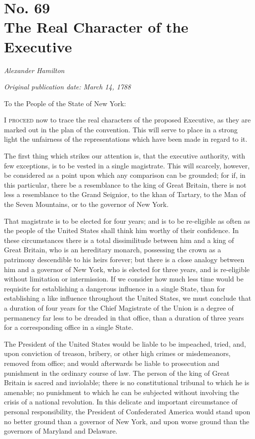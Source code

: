 \chapter[No. 69: The Real Character of the Executive]{No. 69\\ {\small The Real Character of the Executive}}

\textit{Alexander Hamilton}

\textit{Original publication date: March 14, 1788}
\vspace{1cm}

To the People of the State of New York:
\vspace{.4cm}

\textsc{I proceed} now to trace the real characters of the proposed Executive, as they are marked out in the plan of the convention. 
This will serve to place in a strong light the unfairness of the representations which have been made in regard to it.

The first thing which strikes our attention is, that the executive authority, with few exceptions, is to be vested in a single magistrate. 
This will scarcely, however, be considered as a point upon which any comparison can be grounded; for if, in this particular, there be a resemblance to the king of Great Britain, there is not less a resemblance to the Grand Seignior, to the khan of Tartary, to the Man of the Seven Mountains, or to the governor of New York.

That magistrate is to be elected for four years; and is to be re-eligible as often as the people of the United States shall think him worthy of their confidence. 
In these circumstances there is a total dissimilitude between him and a king of Great Britain, who is an hereditary monarch, possessing the crown as a patrimony descendible to his heirs forever; but there is a close analogy between him and a governor of New York, who is elected for three years, and is re-eligible without limitation or intermission. 
If we consider how much less time would be requisite for establishing a dangerous influence in a single State, than for establishing a like influence throughout the United States, we must conclude that a duration of four years for the Chief Magistrate of the Union is a degree of permanency far less to be dreaded in that office, than a duration of three years for a corresponding office in a single State.

The President of the United States would be liable to be impeached, tried, and, upon conviction of treason, bribery, or other high crimes or misdemeanors, removed from office; and would afterwards be liable to prosecution and punishment in the ordinary course of law. 
The person of the king of Great Britain is sacred and inviolable; there is no constitutional tribunal to which he is amenable; no punishment to which he can be subjected without involving the crisis of a national revolution. 
In this delicate and important circumstance of personal responsibility, the President of Confederated America would stand upon no better ground than a governor of New York, and upon worse ground than the governors of Maryland and Delaware.

